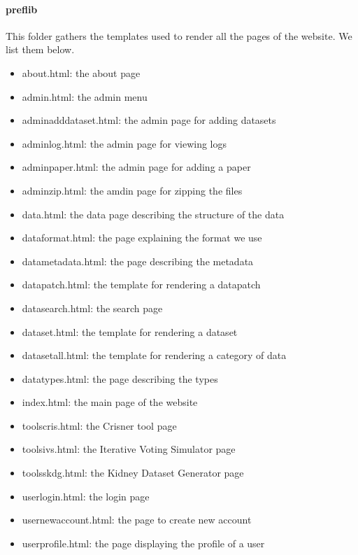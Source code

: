 \documentclass{report}
\begin{document}
	\paragraph*{\faFolderO{} preflib} This folder gathers the templates used to render all the pages of the website. We list them below.
	\begin{multicols}{2}
		\begin{itemize}
			\item[\faFileO] about.html: the about page
			\item[\faFileO] admin.html: the admin menu
			\item[\faFileO] adminadddataset.html: the admin page for adding datasets
			\item[\faFileO] adminlog.html: the admin page for viewing logs
			\item[\faFileO] adminpaper.html: the admin page for adding a paper
			\item[\faFileO] adminzip.html: the amdin page for zipping the files
			\item[\faFileO] data.html: the data page describing the structure of the data
			\item[\faFileO] dataformat.html: the page explaining the format we use
			\item[\faFileO] datametadata.html: the page describing the metadata
			\item[\faFileO] datapatch.html: the template for rendering a datapatch
			\item[\faFileO] datasearch.html: the search page
			\item[\faFileO] dataset.html: the template for rendering a dataset
			\item[\faFileO] datasetall.html: the template for rendering a category of data
			\item[\faFileO] datatypes.html: the page describing the types
			\item[\faFileO] index.html: the main page of the website
			\item[\faFileO] toolscris.html: the Crisner tool page
			\item[\faFileO] toolsivs.html: the Iterative Voting Simulator page
			\item[\faFileO] toolsskdg.html: the Kidney Dataset Generator page
			\item[\faFileO] userlogin.html: the login page
			\item[\faFileO] usernewaccount.html: the page to create new account
			\item[\faFileO] userprofile.html: the page displaying the profile of a user
		\end{itemize}
	\end{multicols}
	
\end{document}
